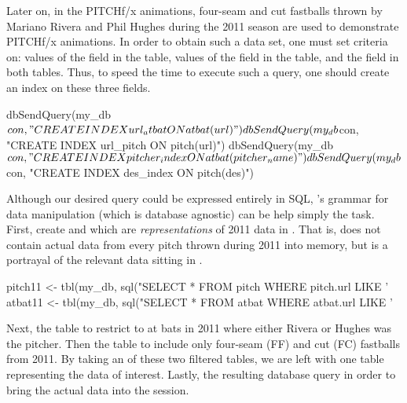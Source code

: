 \begin{article}
\begin{Schunk}
\end{Schunk}


Later on, in the PITCHf/x animations, four-seam and cut fastballs
thrown by Mariano Rivera and Phil Hughes during the 2011 season are
used to demonstrate PITCHf/x animations. In order to obtain such a
data set, one must set criteria on: values of the 
field in the  table, values of the  field
in the  table, and the  field in both tables.
Thus, to speed the time to execute such a query, one should create
an index on these three fields.

\begin{Schunk}
\begin{Sinput}
dbSendQuery(my_db$con, "CREATE INDEX url_atbat ON atbat(url)") 
dbSendQuery(my_db$con, "CREATE INDEX url_pitch ON pitch(url)") 
dbSendQuery(my_db$con, "CREATE INDEX pitcher_index ON atbat(pitcher_name)") 
dbSendQuery(my_db$con, "CREATE INDEX des_index ON pitch(des)")
\end{Sinput}
\end{Schunk}


Although our desired query could be expressed entirely in SQL, 's
grammar for data manipulation (which is database agnostic) can be
help simply the task. First, create  and 
which are \emph{representations} of 2011 data in .
That is,  does not contain actual data from every pitch
thrown during 2011 into memory, but is a portrayal of the relevant
data sitting in .

\begin{Schunk}
\begin{Sinput}
pitch11 <- tbl(my_db, sql("SELECT * FROM pitch WHERE pitch.url LIKE '%year_2011%'"))
atbat11 <- tbl(my_db, sql("SELECT * FROM atbat WHERE atbat.url LIKE '%year_2011%'"))
\end{Sinput}
\end{Schunk}


Next,  the  table to restrict to at bats
in 2011 where either Rivera or Hughes was the pitcher. Then 
the  table to include only four-seam (FF) and cut (FC)
fastballs from 2011. By taking an  of these two
filtered tables, we are left with one table representing the data
of interest. Lastly,  the resulting database query
in order to bring the actual data into the  session.


\end{article}
